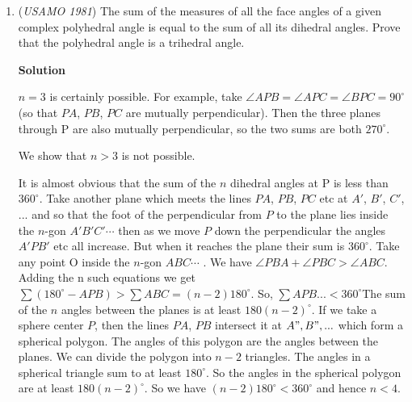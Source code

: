 \begin{enumerate}
 Then, since $x+y+z = 180^\circ$, we conclude $x=y=z=60^\circ$. Then
 \[\sin (x) + \sin (y) + \sin (z) = 3 \cdot \sin (60^\circ) = 3 \cdot \frac{\sqrt{3}}{2}\]So $\frac{\sqrt{3}}{2}$ is indeed the maximum value of $\sin(x) + \sin (y) + \sin (z)$, proving the bound. Translating back into the previous problem, the maximum occurs when $x=y=60^\circ$ and $z=420^\circ$; translating into the original problem, we have proven the upper bound, and equality with the upper bound occurs when $A=B=20^\circ$ and $C=140^\circ$.

 


	\item (\textit{USAMO 1981}) The sum of the measures of all the face angles of a given complex polyhedral angle is equal to the sum of all its dihedral angles. Prove that the polyhedral angle is a trihedral angle.


 



\textbf{Solution}

$n=3$ is certainly possible. For example, take $\angle APB = \angle APC = \angle BPC = 90^\circ$ (so that $PA$, $PB$, $PC$ are mutually perpendicular). Then the three planes through P are also mutually perpendicular, so the two sums are both $270^\circ$.

 We show that $n>3$ is not possible.

 It is almost obvious that the sum of the $n$ dihedral angles at P is less than $360^\circ$. Take another plane which meets the lines $PA$, $PB$, $PC$ etc at $A'$, $B'$, $C'$, ... and so that the foot of the perpendicular from $P$ to the plane lies inside the $n$-gon $A'B'C'\cdots$ then as we move $P$ down the perpendicular the angles $A'PB'$ etc all increase. But when it reaches the plane their sum is $360^\circ$. Take any point O inside the $n$-gon $ABC\cdots$ . We have $\angle PBA + \angle PBC > \angle ABC$. Adding the n such equations we get $\sum(180^\circ - APB) > \sum ABC = (n - 2) 180^\circ$. So, $\sum APB... < 360^\circ$The sum of the $n$ angles between the planes is at least $180(n-2)^\circ$. If we take a sphere center $P$, then the lines $PA$, $PB$ intersect it at $A", B", ...$ which form a spherical polygon. The angles of this polygon are the angles between the planes. We can divide the polygon into $n - 2$ triangles. The angles in a spherical triangle sum to at least $180^\circ$. So the angles in the spherical polygon are at least $180(n-2)^\circ$. So we have $(n - 2) 180^\circ < 360^\circ$ and hence $n < 4$.

 



\end{enumerate}
